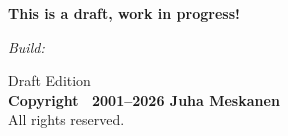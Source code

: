\newpage
\thispagestyle{empty} %
\vspace*{\fill}       %

\begin{flushleft}
    \small
    
    \textbf{This is a draft, work in progress!}

    \textit{Build: \DTMnow}

    \vspace{1.5em} %
    
    Draft Edition \\
    \textbf{Copyright \textcopyright\ 2001--2026 Juha Meskanen} \\
    All rights reserved.
\end{flushleft}
\newpage


